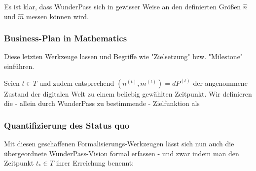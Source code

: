 \vspace{0.3cm}

Es ist klar, dass WunderPass sich in gewisser Weise an den definierten Größen $\widehat{n}$ und $\widehat{m}$ messen können wird. 

\vspace{0.3cm}



\vspace{0.3cm}

\vspace{1cm}















\subsubsection{Business-Plan in Mathematics}
\label{sec:eco_zahlen_business_plan}

Diese letzten Werkzeuge lassen und Begriffe wie "Zielsetzung" bzw. "Milestone" einführen.

\vspace{0.3cm}

\begin{Def}\label{defZiel}

Seien $t \in T$ und zudem entsprechend $(n^{(t)}, m^{(t)}) = dP^{(t)}$ der angenommene Zustand der digitalen Welt zu einem beliebig gewählten Zeitpunkt. Wir definieren die - allein durch WunderPass zu bestimmende - Zielfunktion als

\end{Def}


\subsubsection{Quantifizierung des Status quo}
\label{sec:eco_zahlen_status_quo}


\vspace{1cm}

Mit diesen geschaffenen Formalisierungs-Werkzeugen lässt sich nun auch die übergeordnete WunderPass-Vision formal erfassen - und zwar indem man den Zeitpunkt $t_{*} \in T$ ihrer Erreichung benennt:

